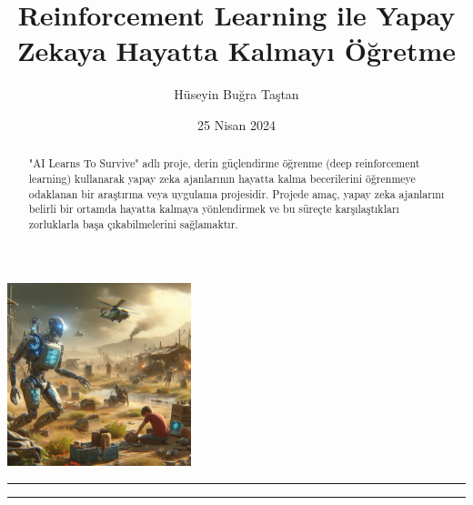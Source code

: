 \documentclass{article}
\title{Reinforcement Learning ile Yapay Zekaya Hayatta Kalmayı Öğretme}
\author{Hüseyin Buğra Taştan}
\date{25 Nisan 2024}
\begin{document}
    \maketitle
    \begin{center}
        \includegraphics[width=0.4\textwidth]{forest.jpg} 
    \end{center}
    \vfill
    \rule{\textwidth}{0.5pt}
    \renewcommand{\abstractname}{Özet}
\begin{abstract}
\noindent "AI Learns To Survive" adlı proje, derin güçlendirme öğrenme (deep reinforcement learning) kullanarak yapay zeka ajanlarının hayatta kalma becerilerini öğrenmeye odaklanan bir araştırma veya uygulama projesidir. Projede amaç, yapay zeka ajanlarını belirli bir ortamda hayatta kalmaya yönlendirmek ve bu süreçte karşılaştıkları zorluklarla başa çıkabilmelerini sağlamaktır.
\end{abstract}
\rule{\textwidth}{0.5pt}
    \vfill

\newpage
\end{document}
